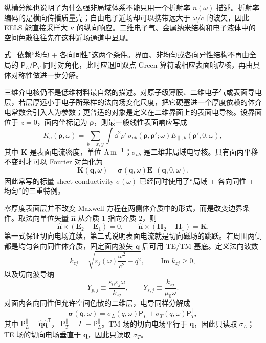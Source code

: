 纵横分解也说明了为什么强非局域体系不能只用一个折射率 $n(\omega)$ 描述。折射率编码的是横向传播质量壳；自由电子近场却可以携带远大于 $\omega/c$ 的波矢，因此 EELS 能直接采样大 $\kappa$ 的纵向响应。二维电子气、金属纳米结构和电子液体中的空间色散往往先在这种近场通道中显现。

式~ 依赖“均匀 + 各向同性”这两个条件。界面、非均匀或各向异性结构不再由全局的 $\mathsf P_L/\mathsf P_T$ 同时对角化，此时应退回双点 Green 算符或相应表面响应核，再由具体对称性做进一步分解。

三维介电核仍不是低维材料最自然的描述。对原子级薄膜、二维电子气或表面导电层，若层厚远小于电子所采样的法向场变化尺度，把它硬塞进一个厚度依赖的体介电常数会引入人为参数；更普适的对象是定义在二维界面上的表面电导核。设界面位于 $z=0$，面内坐标记为 $\boldsymbol\rho$，则最一般线性表面响应写成
\begin{equation}
\boxed{
K_a(\boldsymbol\rho,\omega)
=
\sum_{b=x,y}
\int\dd^2\rho'\,
\sigma_{ab}(\boldsymbol\rho,\boldsymbol\rho';\omega)
E_{\parallel,b}(\boldsymbol\rho',0,\omega),}
\label{eq:general_2d_conductivity_kernel}
\end{equation}
其中 $\mathbf K$ 是表面电流密度，单位 ${\rm A\,m^{-1}}$；$\sigma_{ab}$ 是二维非局域电导核。只有面内平移不变时才可以 Fourier 对角化为
\[
\mathbf K(\mathbf q,\omega)
=
\boldsymbol\sigma(\mathbf q,\omega)
\mathbf E_\parallel(\mathbf q,0,\omega).
\]
因此常写的标量 sheet conductivity $\sigma(\omega)$ 已经同时使用了“局域 + 各向同性 + 均匀”的三重特例。

零厚度表面层并不改变 Maxwell 方程在两侧体介质中的形式，而是改变边界条件。取法向单位矢量 $\hat{\mathbf n}$ 从介质 $1$ 指向介质 $2$，则
\begin{equation}
\boxed{
\hat{\mathbf n}\times(\mathbf E_2-\mathbf E_1)=0,
\qquad
\hat{\mathbf n}\times(\mathbf H_2-\mathbf H_1)=\mathbf K.}
\label{eq:conductive_sheet_maxwell_jump}
\end{equation}
第一式保证切向电场连续，第二式说明表面电流就是切向磁场的跳跃。若周围两侧都是均匀各向同性体介质，固定面内波矢 $\mathbf q$ 后可用 TE/TM 基底。定义法向波数
\[
k_{zj}
=
\sqrt{\varepsilon_j(\omega)\frac{\omega^2}{c^2}-q^2},
\qquad
\operatorname{Im}k_{zj}\ge0,
\]
以及切向波导纳
\begin{equation*}
Y_{p,j}
\equiv
\frac{\varepsilon_0\varepsilon_j\omega}{k_{zj}},
\qquad
Y_{s,j}
\equiv
\frac{k_{zj}}{\mu_0\omega}.
\end{equation*}
对面内各向同性但允许空间色散的二维层，电导同样分解成
\begin{equation}
\boxed{
\boldsymbol\sigma(\mathbf q,\omega)
=
\sigma_L(q,\omega)\mathsf P_L^\parallel
+
\sigma_T(q,\omega)\mathsf P_T^\parallel,}
\label{eq:2d_conductivity_LT_decomposition}
\end{equation}
其中
$\mathsf P_L^\parallel=\hat{\mathbf q}\hat{\mathbf q}^{\mathsf T}$，
$\mathsf P_T^\parallel=I_\parallel-\mathsf P_L^\parallel$。TM 场的切向电场平行于 $\mathbf q$，因此只读取 $\sigma_L$；TE 场的切向电场垂直于 $\mathbf q$，因此只读取 $\sigma_T$。


